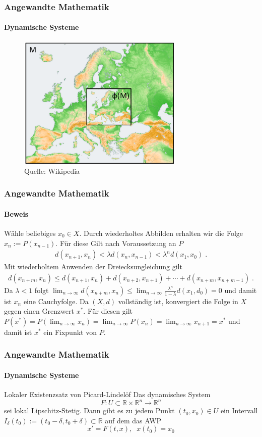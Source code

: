 \documentclass{beamer}
\begin{document}
\begin{frame}
    \frametitle{Angewandte Mathematik}
\framesubtitle{Dynamische Systeme }
\begin{figure}[H]
      \centering
    \includegraphics[width=0.7\textwidth]{images/banach}
\caption{Quelle: Wikipedia}
\end{figure}

 \end{frame}


\begin{frame}
    \frametitle{Angewandte Mathematik}
\framesubtitle{Beweis}
Wähle beliebiges $x_0 \in X$. Durch wiederholtes Abbilden erhalten wir die Folge  $x_n:= P(x_{n-1})$. Für diese Gilt nach Voraussetzung an $P$
\begin{align*}
d(x_{n+1} , x_{n}) < \lambda d(x_{n} , x_{n-1})   < \lambda^n d(x_{1} , x_{0})  \; .
\end{align*}
Mit wiederholtem Anwenden der Dreiecksungleichung gilt 
\begin{align*}
d(x_{n + m} , x_{ n}) \leq d(x_{n+1} , x_{n})  +  d(x_{n +2} , x_{n +1}) +   \cdots   +  d(x_{n + m } , x_{n +m -1}) \; .
\end{align*}
Da $\lambda < 1$ folgt $  \lim_{n \to \infty} d(x_{n + m} , x_{ n})   \leq  \lim_{n \to \infty} \frac{\lambda^n}{1 - \lambda} d(x_{1} , d_{0}) = 0$ und damit ist $x_n$ eine Cauchyfolge.  Da $(X,d)$ vollständig ist, konvergiert die Folge in $X$ gegen einen Grenzwert $x^*$. Für diesen gilt $P(x^*) =  P (  \lim_{n \to \infty}  x_n) =  \lim_{n \to \infty} P(x_n)  =  \lim_{n \to \infty} x_{n+1} = x^*$ und damit ist $x^*$ ein Fixpunkt von $P$.

 \end{frame}

\begin{frame}
    \frametitle{Angewandte Mathematik}
\framesubtitle{Dynamische Systeme }
\begin{block}{Lokaler Existenzsatz von Picard-Lindelöf}
Das dynamisches System  $$F : U \subset \mathbb{R} \times \mathbb{R}^n \to \mathbb{R}^n$$ sei lokal Lipschitz-Stetig. 
Dann gibt es zu jedem Punkt $(t_0, x_0) \in U$ ein Intervall $I_\delta (t_0) := (t_0 - \delta, t_0 + \delta) \subset \mathbb{R}$ auf dem das AWP 
$$ x' = F(t,x), \; \; x(t_0) = x_0$$
\end{block}

 \end{frame}
\end{document}
